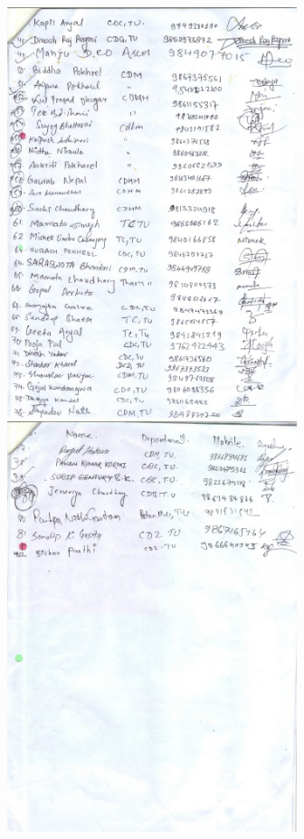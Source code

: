 \documentclass[a4paper,12pt]{report}
\begin{document}
\begin{figure}[h!]
  \centering
  \includegraphics[width=12cm, height=12cm]{3.jpg}
  \includegraphics[width=12cm, height=12cm]{4.jpg}
\end{figure}
\end{document}
